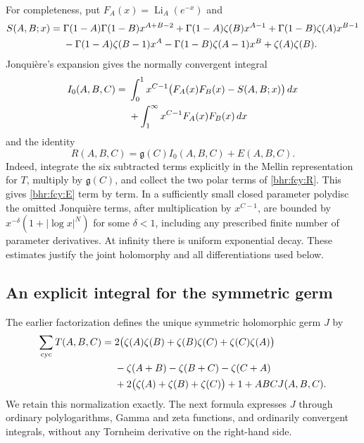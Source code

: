 \documentclass[11pt]{article}
\numberwithin{equation}{section}
\theoremstyle{plain}
\theoremstyle{definition}
\theoremstyle{remark}
\begin{document}
For completeness, put \(F_A(x)=\operatorname{Li}_A(e^{-x})\) and
\begin{align}
 S(A,B;x)={}&\Gamma(1-A)\Gamma(1-B)x^{A+B-2}
 +\Gamma(1-A)\zeta(B)x^{A-1}
 +\Gamma(1-B)\zeta(A)x^{B-1}\notag\\
 &-\Gamma(1-A)\zeta(B-1)x^A
 -\Gamma(1-B)\zeta(A-1)x^B+\zeta(A)\zeta(B).
 \label{bhr:fcy:S}
\end{align}
Jonqui\`ere's expansion \cite[25.12.12]{bhr:DLMFPolylog} gives the
normally convergent integral
\begin{align}
 I_0(A,B,C)={}&\int_0^1x^{C-1}\bigl(F_A(x)F_B(x)-S(A,B;x)\bigr)\,dx
 \notag\\
 &+\int_1^\infty x^{C-1}F_A(x)F_B(x)\,dx
 \label{bhr:fcy:I0}
\end{align}
and the identity
\begin{equation}\label{bhr:fcy:RE}
 R(A,B,C)=\mathfrak g(C)I_0(A,B,C)+E(A,B,C).
\end{equation}
Indeed, integrate the six subtracted terms explicitly in the Mellin
representation for \(T\), multiply by \(\mathfrak g(C)\), and collect the
two polar terms of \eqref{bhr:fcy:R}. This gives
\eqref{bhr:fcy:E} term by term. In a sufficiently small closed parameter
polydisc the omitted Jonqui\`ere terms, after multiplication by
\(x^{C-1}\), are bounded by
\(x^{-\delta}(1+|\log x|^N)\) for some \(\delta<1\), including
any prescribed finite number of parameter derivatives. At infinity
there is uniform exponential decay. These estimates justify the
joint holomorphy and all differentiations used below.

\subsection{An explicit integral for the symmetric germ}

The earlier factorization defines the unique symmetric holomorphic
germ \(J\) by
\begin{align}
 \sum_{\mathrm{cyc}}T(A,B,C)={}&
 2\bigl(\zeta(A)\zeta(B)+\zeta(B)\zeta(C)+\zeta(C)\zeta(A)\bigr)
 \notag\\
 &-\zeta(A+B)-\zeta(B+C)-\zeta(C+A)\notag\\
 &+2\bigl(\zeta(A)+\zeta(B)+\zeta(C)\bigr)+1+ABCJ(A,B,C).
 \label{bhr:fcy:J}
\end{align}
We retain this normalization exactly. The next formula expresses
\(J\) through ordinary polylogarithms, Gamma and zeta functions,
and ordinarily convergent integrals, without any Tornheim derivative
on the right-hand side.
\end{document}

